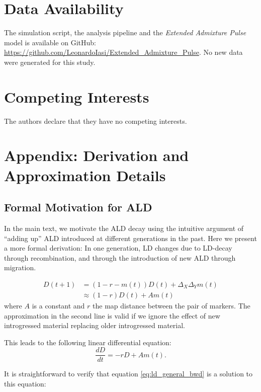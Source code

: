 \documentclass[11pt]{article}
\makeatletter
\newcommand*\referencetitle[1]{\def\@currentlabelname{#1}}
\makeatother
\begin{document}
\section{Data Availability}\label{Data Availability}

The simulation script, the analysis pipeline and the \emph{Extended Admixture Pulse} model is  available  on  GitHub: \url{https://github.com/LeonardoIasi/Extended_Admixture_Pulse}. No new data were generated for this study.

\section{Competing Interests}

The authors declare that they have no competing interests.


\appendix
\section{Appendix: Derivation and Approximation Details}
\setcounter{equation}{0}
\renewcommand{\theequation}{A\arabic{equation}}

\subsection{Formal Motivation for ALD}\referencetitle{A}\label{Appendix_1}
In the main text, we motivate the ALD decay using the intuitive argument of ``adding up'' ALD introduced at different generations in the past. Here we present a more formal derivation: In one generation, LD changes due to LD-decay through recombination, and through the introduction of new ALD through migration.

\begin{align}
    D(t+1) &= (1-r-m(t)) D(t) + \Delta_X \Delta_Y m(t)\nonumber\\
    &\approx (1-r) D(t) + A m(t)
\end{align}
where $A$ is a constant and $r$ the map distance between the pair of markers. The approximation in the second line is valid if we ignore the effect of new introgressed material replacing older introgressed material.

This leads to the following linear differential equation:
\begin{equation}
    \frac{dD}{dt} = -r D + A m(t)\text{.}
\end{equation}

It is straightforward to verify that equation \ref{eq:ld_general_bwd} is a solution to this equation:
\end{document}
